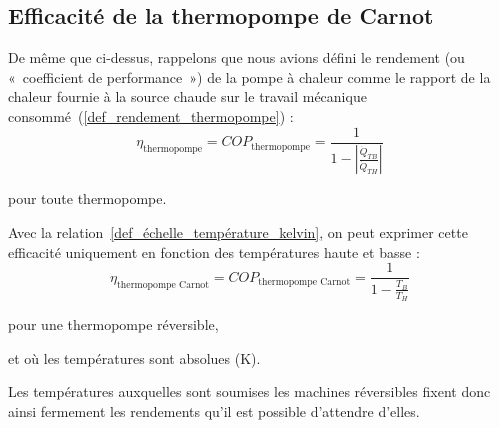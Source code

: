 		 

	\subsection{Efficacité de la thermopompe de Carnot}

		De même que ci-dessus, rappelons que nous avions défini le rendement (ou «~coefficient de performance~») de la pompe à chaleur comme le rapport de la chaleur fournie à la source chaude sur le travail mécanique consommé~(\ref{def_rendement_thermopompe}) :
		\begin{equation}
			\eta_\text{thermopompe} = COP_\text{thermopompe} = \frac{1}{1 - \left| \frac{\dot{Q}_{TB}}{\dot{Q}_{TH}} \right|} \tag{6/9}
		\end{equation}

		\begin{equationterms}
			\item pour toute thermopompe.
		\end{equationterms}

		Avec la relation~\ref{def_échelle_température_kelvin}, on peut exprimer cette efficacité uniquement en fonction des températures haute et basse :
		\begin{equation}
			\eta_\text{thermopompe Carnot} = COP_\text{thermopompe Carnot} = \frac{1}{1 - \frac{T_B}{T_H}}
			\label{eq_efficacité_thermopompe_carnot_température}
		\end{equation}

		\begin{equationterms}
			\item pour une thermopompe réversible,
			\item et où les températures sont absolues (\si{\kelvin}).
		\end{equationterms}

		Les températures auxquelles sont soumises les machines réversibles fixent donc ainsi fermement les rendements qu’il est possible d’attendre d’elles.
